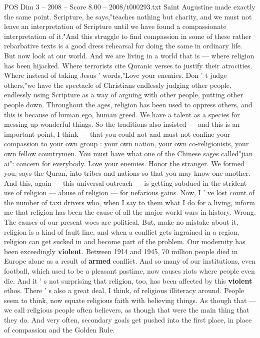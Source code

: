 \begin{textsample}{POS Dim 3 – 2008 – Score 8.00 – 2008/t000293.txt}
Saint Augustine made exactly the same point.
Scripture, he says,"teaches nothing but charity, and we must not leave an interpretation of Scripture until we have found a compassionate interpretation of it."And this struggle to find compassion in some of these rather rebarbative texts is a good dress rehearsal for doing the same in ordinary life.
But now look at our world.
And we are living in a world that is — where religion has been hijacked.
Where terrorists cite Quranic verses to justify their atrocities.
Where instead of taking Jesus ' words,"Love your enemies.
Don ' t judge others,"we have the spectacle of Christians endlessly judging other people, endlessly using Scripture as a way of arguing with other people, putting other people down.
Throughout the ages, religion has been used to oppress others, and this is because of human ego, human greed.
We have a talent as a species for messing up wonderful things.
So the traditions also insisted — and this is an important point, I think — that you could not and must not confine your compassion to your own group : your own nation, your own co-religionists, your own fellow countrymen.
You must have what one of the Chinese sages called"jian ai": concern for everybody.
Love your enemies.
Honor the stranger.
We formed you, says the Quran, into tribes and nations so that you may know one another.
And this, again — this universal outreach — is getting subdued in the strident use of religion — abuse of religion — for nefarious gains.
Now, I ' ve lost count of the number of taxi drivers who, when I say to them what I do for a living, inform me that religion has been the cause of all the major world wars in history.
Wrong.
The causes of our present woes are political.
But, make no mistake about it, religion is a kind of fault line, and when a conflict gets ingrained in a region, religion can get sucked in and become part of the problem.
Our modernity has been exceedingly \textbf{violent}.
Between 1914 and 1945, 70 million people died in Europe alone as a result of \textbf{armed} conflict.
And so many of our institutions, even football, which used to be a pleasant pastime, now causes riots where people even die.
And it ' s not surprising that religion, too, has been affected by this \textbf{violent} ethos.
There ' s also a great deal, I think, of religious illiteracy around.
People seem to think, now equate religious faith with believing things.
As though that — we call religious people often believers, as though that were the main thing that they do.
And very often, secondary goals get pushed into the first place, in place of compassion and the Golden Rule.

\end{textsample}
